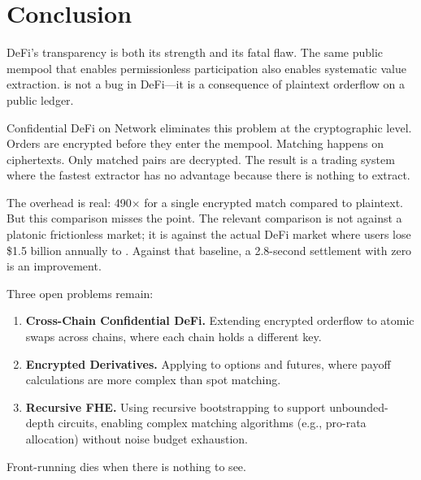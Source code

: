 \section{Conclusion}

\label{sec:conclusion}

DeFi's transparency is both its strength and its fatal flaw. The same public mempool that enables permissionless participation also enables systematic value extraction. \MEV{} is not a bug in DeFi---it is a consequence of plaintext orderflow on a public ledger.

Confidential DeFi on \Zoo{} Network eliminates this problem at the cryptographic level. Orders are encrypted before they enter the mempool. Matching happens on ciphertexts. Only matched pairs are decrypted. The result is a trading system where the fastest extractor has no advantage because there is nothing to extract.

The overhead is real: 490$\times$ for a single encrypted match compared to plaintext. But this comparison misses the point. The relevant comparison is not against a platonic frictionless market; it is against the actual DeFi market where users lose \$1.5 billion annually to \MEV{}. Against that baseline, a 2.8-second settlement with zero \MEV{} is an improvement.

Three open problems remain:

\begin{enumerate}
    \item \textbf{Cross-Chain Confidential DeFi.} Extending encrypted orderflow to atomic swaps across chains, where each chain holds a different \FHE{} key.
    \item \textbf{Encrypted Derivatives.} Applying \FHE{} to options and futures, where payoff calculations are more complex than spot matching.
    \item \textbf{Recursive FHE.} Using recursive bootstrapping to support unbounded-depth circuits, enabling complex matching algorithms (e.g., pro-rata allocation) without noise budget exhaustion.
\end{enumerate}

Front-running dies when there is nothing to see.


